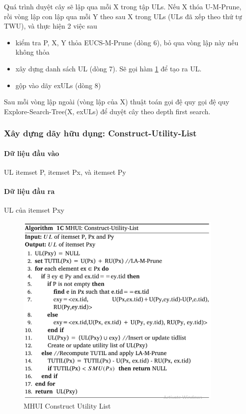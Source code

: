 Quá trình duyệt cây sẽ lập qua mỗi X trong tập ULs. Nếu X thóa U-M-Prune, rồi vòng lập con lập qua mỗi Y theo sau X trong ULs (ULs đã xếp theo thứ tự TWU), và thực hiện 2 việc sau 

\begin{itemize}
  \item kiểm tra P, X, Y thỏa EUCS-M-Prune (dòng 6), bỏ qua vòng lập này nếu không thỏa   
  \item xây dựng danh sách UL (dòng 7). Sẽ gọi hàm \ref{fig:algo3} để tạo ra UL. 
  \item gộp vào dãy exULs (dòng 8) 
\end{itemize}
 
Sau mỗi vòng lập ngoài (vòng lập của X) thuật toán gọi đệ quy gọi đệ quy Explore-Search-Tree(X, exULs) để duyệt cây theo depth first search. 

\subsubsection{Xây dựng dãy hữu dụng: Construct-Utility-List }

\paragraph{Dữ liệu đầu vào} UL itemset P, itemset Px, và itemset Py 

\paragraph{Dữ liệu đầu ra} UL của itemset Pxy \\

\begin{figure}[ht]
\centering
\includegraphics[width=0.9\textwidth]{image/algo/algo3.PNG}
\caption{\label{fig:algo3} MHUI Construct Utility List}
\end{figure}


